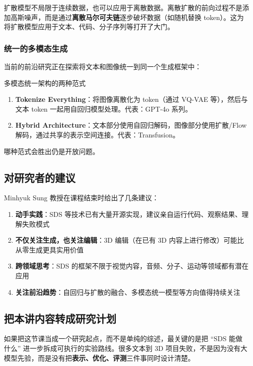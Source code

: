 \documentclass[a4paper]{article}
\begin{document}
扩散模型不局限于连续数据，也可以应用于离散数据。离散扩散的前向过程不是添加高斯噪声，而是通过\textbf{离散马尔可夫链}逐步破坏数据（如随机替换 token）。这为将扩散模型应用于文本、代码、分子序列等打开了大门。

\subsubsection{统一的多模态生成}

当前的前沿研究正在探索将文本和图像统一到同一个生成框架中：

\begin{knowledgebox}{多模态统一架构的两种范式}
\begin{enumerate}
    \item \textbf{Tokenize Everything}：将图像离散化为 token（通过 VQ-VAE 等），然后与文本 token 一起用自回归模型处理。代表：GPT-4o 系列。
    \item \textbf{Hybrid Architecture}：文本部分使用自回归解码，图像部分使用扩散/Flow 解码，通过共享的表示空间连接。代表：Transfusion。
\end{enumerate}

哪种范式会胜出仍是开放问题。
\end{knowledgebox}

\subsection{对研究者的建议}

Minhyuk Sung 教授在课程结束时给出了几条建议：

\begin{enumerate}
    \item \textbf{动手实践}：SDS 等技术已有大量开源实现，建议亲自运行代码、观察结果、理解失败模式
    \item \textbf{不仅关注生成，也关注编辑}：3D 编辑（在已有 3D 内容上进行修改）可能比从零生成更具实用价值
    \item \textbf{跨领域思考}：SDS 的框架不限于视觉内容，音频、分子、运动等领域都有潜在应用
    \item \textbf{关注前沿趋势}：自回归与扩散的融合、多模态统一模型等方向值得持续关注
\end{enumerate}

\subsection{把本讲内容转成研究计划}

如果把这节课当成一个研究起点，而不是单纯的综述，最关键的是把 ``SDS 能做什么'' 进一步拆成可执行的实验路线。很多文本到 3D 项目失败，不是因为没有大模型先验，而是没有把\textbf{表示、优化、评测}三件事同时设计清楚。
\end{document}
